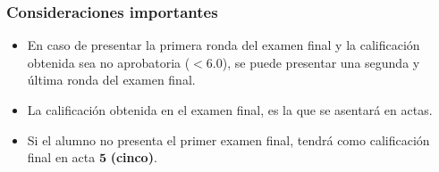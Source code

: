\begin{frame}
\frametitle{Consideraciones importantes}
\begin{itemize}
\setlength{\itemsep}{0mm}
\item En caso de presentar la primera ronda del examen final y la calificación obtenida sea no aprobatoria ($<6.0$), se puede presentar una segunda y última ronda del examen final.
\item La calificación obtenida en el examen final, es la que se asentará en actas.
\item Si el alumno no presenta el primer examen final, tendrá como calificación final en acta $\mathbf{5}$ \textbf{(cinco)}. 
\end{itemize}
\end{frame}
